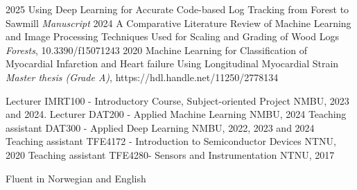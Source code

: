 

\begin{cvSmallExps}
    \cvSmallExp
        {2025} %
        {Using Deep Learning for Accurate Code-based Log Tracking from Forest to Sawmill} %
        {\textit{Manuscript}} %
    \cvSmallExp
        {2024} %
        {A Comparative Literature Review of Machine Learning and Image Processing Techniques Used for Scaling and Grading of Wood Logs} %
        {\textit{Forests}, 10.3390/f15071243} %
    \cvSmallExp
        {2020} %
        {Machine Learning for Classification of Myocardial Infarction and Heart failure Using Longitudinal Myocardial Strain} %
        {\textit{Master thesis (Grade A)}, https://hdl.handle.net/11250/2778134} %
\end{cvSmallExps}

\vspace{1em} %


\begin{cvSmallExps}
    \cvSmallExp
        {Lecturer} %
        {IMRT100 - Introductory Course, Subject-oriented Project} %
        {NMBU, 2023 and 2024.} %
    \cvSmallExp
        {Lecturer} %
        {DAT200 - Applied Machine Learning} %
        {NMBU, 2024} %
    \cvSmallExp
        {Teaching assistant} %
        {DAT300 - Applied Deep Learning} %
        {NMBU, 2022, 2023 and 2024} %
    \cvSmallExp
        {Teaching assistant} %
        {TFE4172 - Introduction to Semiconductor Devices} %
        {NTNU, 2020} %
    \cvSmallExp
        {Teaching assistant} %
        {TFE4280- Sensors and Instrumentation} %
        {NTNU, 2017} %
\end{cvSmallExps}

\vspace{1em} %


\begin{cvSmallExps}
    \cvSmallExp
        {Fluent in}
        {Norwegian and English}
        {} 
\end{cvSmallExps}

